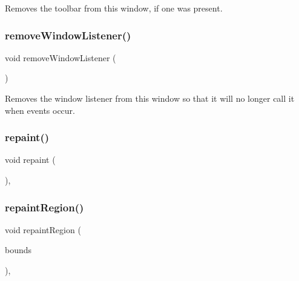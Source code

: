 Removes the toolbar from this window, if one was present. 

\mbox{\label{classGWindow_ab1ea252520cc160b329cfb5b038add83}} 
\subsubsection{\texorpdfstring{remove\+Window\+Listener()}{removeWindowListener()}}
{\footnotesize\ttfamily void remove\+Window\+Listener (\begin{DoxyParamCaption}{ }\end{DoxyParamCaption})\hspace{0.3cm}{\ttfamily [virtual]}}



Removes the window listener from this window so that it will no longer call it when events occur. 

\mbox{\label{classGForwardDrawingSurface_afb8dbc55702230f0030e47d6c009697f}} 
\subsubsection{\texorpdfstring{repaint()}{repaint()}}
{\footnotesize\ttfamily void repaint (\begin{DoxyParamCaption}{ }\end{DoxyParamCaption})\hspace{0.3cm}{\ttfamily [override]}, {\ttfamily [inherited]}}

\mbox{\label{classGDrawingSurface_a769c46fb3e1004aec76e8b0adfa42aa6}} 
\subsubsection{\texorpdfstring{repaint\+Region()}{repaintRegion()}\hspace{0.1cm}{\footnotesize\ttfamily [1/2]}}
{\footnotesize\ttfamily void repaint\+Region (\begin{DoxyParamCaption}\item[{const \mbox{\hyperlink{structGRectangle}{G\+Rectangle}} \&}]{bounds }\end{DoxyParamCaption})\hspace{0.3cm}{\ttfamily [virtual]}, {\ttfamily [inherited]}}




